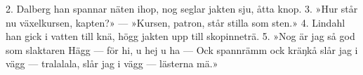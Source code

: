 2.  Dalberg han spannar näten ihop,
    nog seglar jakten sju, åtta knop.
3.  »Hur står nu växelkursen, kapten?» —
    »Kursen, patron, står stilla som sten.»
4.  Lindahl han gick i vatten till knä,
    högg jakten upp till skopinneträ.
5.  »Nog är jag så god som slaktaren Hägg —
    för hi, u hej u ha —
    Ock spannrämm ock kräŋkå slår jag i vägg —
    tralalala, slår jag i vägg —
    lästerna mä.»
